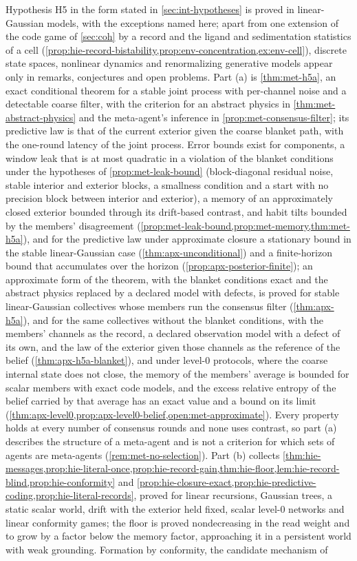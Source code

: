 Hypothesis H5 in the form stated in \cref{sec:int-hypotheses} is proved in linear-Gaussian models, with the exceptions named here; apart from one extension of the code game of \cref{sec:coh} by a record and the ligand and sedimentation statistics of a cell (\cref{prop:hie-record-bistability,prop:env-concentration,ex:env-cell}), discrete state spaces, nonlinear dynamics and renormalizing generative models appear only in remarks, conjectures and open problems. Part (a) is \cref{thm:met-h5a}, an exact conditional theorem for a stable joint process with per-channel noise and a detectable coarse filter, with the criterion for an abstract physics in \cref{thm:met-abstract-physics} and the meta-agent's inference in \cref{prop:met-consensus-filter}; its predictive law is that of the current exterior given the coarse blanket path, with the one-round latency of the joint process. Error bounds exist for components, a window leak that is at most quadratic in a violation of the blanket conditions under the hypotheses of \cref{prop:met-leak-bound} (block-diagonal residual noise, stable interior and exterior blocks, a smallness condition and a start with no precision block between interior and exterior), a memory of an approximately closed exterior bounded through its drift-based contrast, and habit tilts bounded by the members' disagreement (\cref{prop:met-leak-bound,prop:met-memory,thm:met-h5a}), and for the predictive law under approximate closure a stationary bound in the stable linear-Gaussian case (\cref{thm:apx-unconditional}) and a finite-horizon bound that accumulates over the horizon (\cref{prop:apx-posterior-finite}); an approximate form of the theorem, with the blanket conditions exact and the abstract physics replaced by a declared model with defects, is proved for stable linear-Gaussian collectives whose members run the consensus filter (\cref{thm:apx-h5a}), and for the same collectives without the blanket conditions, with the members' channels as the record, a declared observation model with a defect of its own, and the law of the exterior given those channels as the reference of the belief (\cref{thm:apx-h5a-blanket}), and under level-0 protocols, where the coarse internal state does not close, the memory of the members' average is bounded for scalar members with exact code models, and the excess relative entropy of the belief carried by that average has an exact value and a bound on its limit (\cref{thm:apx-level0,prop:apx-level0-belief,open:met-approximate}). Every property holds at every number of consensus rounds and none uses contrast, so part (a) describes the structure of a meta-agent and is not a criterion for which sets of agents are meta-agents (\cref{rem:met-no-selection}). Part (b) collects \cref{thm:hie-messages,prop:hie-literal-once,prop:hie-record-gain,thm:hie-floor,lem:hie-record-blind,prop:hie-conformity} and \cref{prop:hie-closure-exact,prop:hie-predictive-coding,prop:hie-literal-records}, proved for linear recursions, Gaussian trees, a static scalar world, drift with the exterior held fixed, scalar level-0 networks and linear conformity games; the floor is proved nondecreasing in the read weight and to grow by a factor below the memory factor, approaching it in a persistent world with weak grounding. Formation by conformity, the candidate mechanism of 